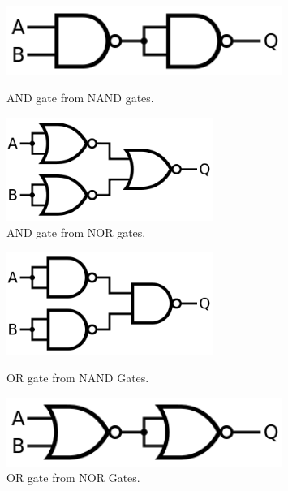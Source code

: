     \begin{figure}[H]   
        \begin{minipage}{0.5\textwidth}
            \centering
    	    \includegraphics[width=0.8\textwidth]{figures/AND_from_NAND.png}
	        \caption{AND gate from NAND gates.}
	        \label{fig:NAND_AND} 
	    \end{minipage}	
        \begin{minipage}{0.5\textwidth}
            \centering
    	    \includegraphics[width=0.6\textwidth]{figures/AND_from_NOR.png}
            \caption{AND gate from NOR gates.}
            \label{fig:NOR_AND}
        \end{minipage}
    \end{figure}

    \begin{figure}[H]   
        \begin{minipage}{0.5\textwidth}
            \centering
    	    \includegraphics[width=0.6\textwidth]{figures/OR_from_NAND.png}
	        \caption{OR gate from NAND Gates.}
	        \label{fig:NAND_OR} 
	    \end{minipage}	
        \begin{minipage}{0.5\textwidth}
            \centering
    	    \includegraphics[width=0.8\textwidth]{figures/OR_from_NOR.png}
            \caption{OR gate from NOR Gates.}
            \label{fig:NOR_OR}
        \end{minipage}
    \end{figure}
